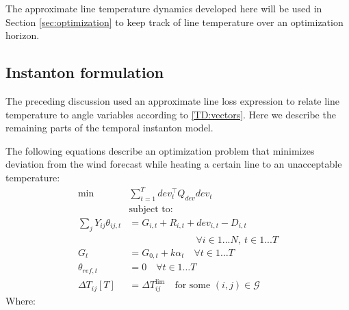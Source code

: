 \documentclass[conference]{IEEEtran}
\begin{document}
The approximate line temperature dynamics developed here will be used in Section \ref{sec:optimization} to keep track of line temperature over an optimization horizon.

\subsection{Instanton formulation}\label{sec:instanton-formulation}
The preceding discussion used an approximate line loss expression to relate line temperature to angle variables according to \eqref{TD:vectors}. Here we describe the remaining parts of the temporal instanton model.

The following equations describe an optimization problem that minimizes deviation from the wind forecast while heating a certain line to an unacceptable temperature:
\begin{subequations}\label{I:all}
\begin{align}
\label{I:obj}\min & \sum_{t=1}^{T} dev_t^\top Q_{dev} dev_t \\
\nonumber& \text{subject to:} \\
\label{I:flow} \sum_j Y_{ij} \theta_{ij,t} & = G_{i,t} + R_{i,t} + dev_{i,t} - D_{i,t}\\[-10pt]
\nonumber &\qquad\qquad\qquad\quad \forall i \in 1... N,~t\in 1... T \\[6pt]
\label{I:conv} G_t &= G_{0,t} + k\alpha_t \quad \forall t\in 1\ldots T \\
\label{I:slack} \theta_{ref,t} & = 0 \quad \forall t\in 1\ldots T \\
\label{I:lim} \Delta T_{ij}[T] &= \Delta T_{ij}^\text{lim}\quad \text{for some }(i,j)\in \mathcal{G}
\end{align}
\end{subequations}
Where:
\end{document}
